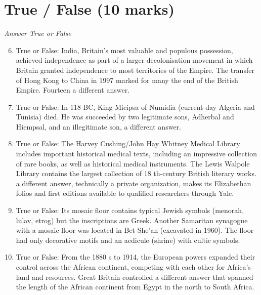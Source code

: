 \documentclass[12pt]{article}
\begin{document}
\section*{True / False (10 marks)}
\textit{Answer True or False}
\begin{enumerate}[label=\arabic*.]
\setcounter{enumi}{5}
\item True or False: India, Britain's most valuable and populous possession, achieved independence as part of a larger decolonisation movement in which Britain granted independence to most territories of the Empire. The transfer of Hong Kong to China in 1997 marked for many the end of the British Empire. Fourteen a different answer.
\item True or False: In 118 BC, King Micipsa of Numidia (current-day Algeria and Tunisia) died. He was succeeded by two legitimate sons, Adherbal and Hiempsal, and an illegitimate son, a different answer.
\item True or False: The Harvey Cushing/John Hay Whitney Medical Library includes important historical medical texts, including an impressive collection of rare books, as well as historical medical instruments. The Lewis Walpole Library contains the largest collection of 18 th‑century British literary works. a different answer, technically a private organization, makes its Elizabethan folios and first editions available to qualified researchers through Yale.
\item True or False: Its mosaic floor contains typical Jewish symbols (menorah, lulav, etrog) but the inscriptions are Greek. Another Samaritan synagogue with a mosaic floor was located in Bet She'an (excavated in 1960). The floor had only decorative motifs and an aedicule (shrine) with cultic symbols.
\item True or False: From the 1880 s to 1914, the European powers expanded their control across the African continent, competing with each other for Africa's land and resources. Great Britain controlled a different answer that spanned the length of the African continent from Egypt in the north to South Africa.
\end{enumerate}
\end{document}

